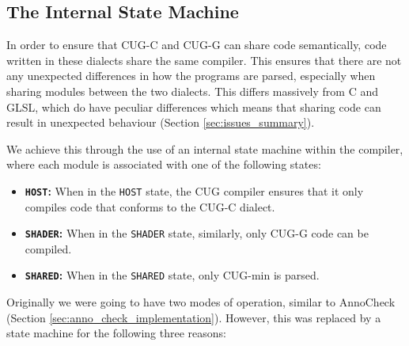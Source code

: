 \documentclass[a4paper,12pt,twoside,openright]{report}
\begin{document}
\subsection{The Internal State Machine}

\label{sec:internal_state_machine}

In order to ensure that CUG-C and CUG-G can share code semantically, code
written in these dialects share the same compiler. This ensures that there are
not any unexpected differences in how the programs are parsed, especially when
sharing modules between the two dialects. This differs massively from C and
GLSL, which do have peculiar differences which means that sharing code can
result in unexpected behaviour (Section \ref{sec:issues_summary}).

We achieve this through the use of an internal state machine within the
compiler, where each module is associated with one of the following states:

\begin{itemize}

    \item \textbf{\texttt{HOST}:} When in the \texttt{HOST} state, the CUG
    compiler ensures that it only compiles code that conforms to the CUG-C
    dialect.

    \item \textbf{\texttt{SHADER}:} When in the \texttt{SHADER} state,
    similarly, only CUG-G code can be compiled.

    \item \textbf{\texttt{SHARED}:} When in the \texttt{SHARED} state, only
    CUG-min is parsed.

\end{itemize}

Originally we were going to have two modes of operation, similar to AnnoCheck
(Section \ref{sec:anno_check_implementation}). However, this was replaced by
a state machine for the following three reasons:
\end{document}
